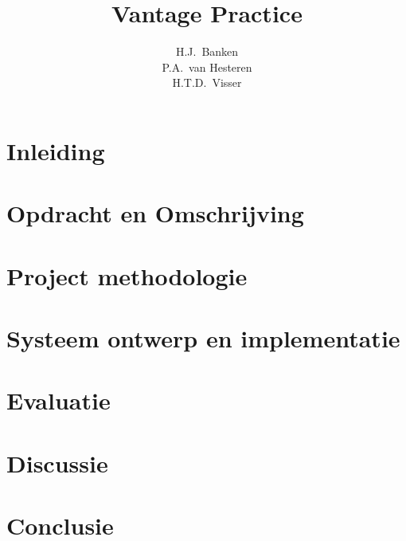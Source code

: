 \documentclass[dutch]{style/tudelft-report}
\begin{document}
\frontmatter

\title[Bachelorproject]{Vantage Practice}
\author{H.J.\ Banken \\ P.A.\ van Hesteren \\ H.T.D.\ Visser}





\tableofcontents



\mainmatter

\chapter{Inleiding} \label{ch:inleiding} 

\chapter{Opdracht en Omschrijving} \label{ch:opdracht-en-omschrijving} 

\chapter{Project methodologie} \label{ch:project-methodologie} 

\chapter{Systeem ontwerp en implementatie} \label{ch:systeem-ontwerp-en-implementatie} 

\chapter{Evaluatie} \label{ch:evaluatie} 

\chapter{Discussie} \label{ch:discussie} 

\chapter{Conclusie} \label{ch:conclusie} 
\end{document}
